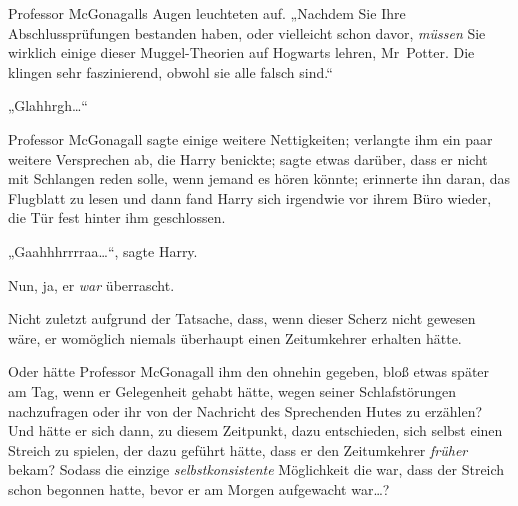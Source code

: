 Professor McGonagalls Augen leuchteten auf. „Nachdem Sie Ihre Abschlussprüfungen bestanden haben, oder vielleicht schon davor, \emph{müssen} Sie wirklich einige dieser Muggel-Theorien auf Hogwarts lehren, Mr~Potter. Die klingen sehr faszinierend, obwohl sie alle falsch sind.“

„Glahhrgh…“

Professor McGonagall sagte einige weitere Nettigkeiten; verlangte ihm ein paar weitere Versprechen ab, die Harry benickte; sagte etwas darüber, dass er nicht mit Schlangen reden solle, wenn jemand es hören könnte; erinnerte ihn daran, das Flugblatt zu lesen und dann fand Harry sich irgendwie vor ihrem Büro wieder, die Tür fest hinter ihm geschlossen.

„Gaahhhrrrraa…“, sagte Harry.

Nun, ja, er \emph{war} überrascht.

Nicht zuletzt aufgrund der Tatsache, dass, wenn dieser Scherz nicht gewesen wäre, er womöglich niemals überhaupt einen Zeitumkehrer erhalten hätte.

Oder hätte Professor McGonagall ihm den ohnehin gegeben, bloß etwas später am Tag, wenn er Gelegenheit gehabt hätte, wegen seiner Schlafstörungen nachzufragen oder ihr von der Nachricht des Sprechenden Hutes zu erzählen? Und hätte er sich dann, zu diesem Zeitpunkt, dazu entschieden, sich selbst einen Streich zu spielen, der dazu geführt hätte, dass er den Zeitumkehrer \emph{früher} bekam? Sodass die einzige \emph{selbstkonsistente} Möglichkeit die war, dass der Streich schon begonnen hatte, bevor er am Morgen aufgewacht war…?

